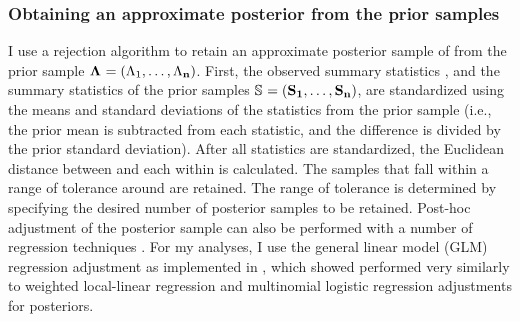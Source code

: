 \subsubsection{Obtaining an approximate posterior from the prior samples}
I use a rejection algorithm to retain an approximate posterior sample of
\paramSampleVector{} from the prior sample
$\boldsymbol{\Lambda_{}} = (\Lambda_{1}, \ldots, \Lambda_{\mathbf{n}})$.
First, the observed summary statistics \ssVectorObs, and the summary statistics
of the prior samples 
$\ssMatrix = (\ssVector{1}, \ldots, \ssVector{\numPriorSamples})$,
are standardized using the means and standard deviations of the statistics from
the prior sample (i.e., the prior mean is subtracted from each statistic, and the
difference is divided by the prior standard deviation).
After all statistics are standardized, the Euclidean distance between
\ssVectorObs and each \ssVector{} within \ssMatrix is calculated.
The samples that fall within a range of tolerance \tol around \ssVectorObs
are retained.
The range of tolerance is determined by specifying the desired number of
posterior samples to be retained.
Post-hoc adjustment of the posterior sample can also be performed with a number
of regression techniques \citep{Beaumont2002,Blum2009,Leuenberger2010}.
For my analyses, I use the general linear model (GLM) regression adjustment
\citep{Leuenberger2010} as implemented in \abctoolbox
\citep[v1.1;][]{ABCtoolbox}, which \citet{Oaks2012} showed performed very
similarly to weighted local-linear regression and multinomial logistic
regression adjustments \citep{Beaumont2002} for \msb posteriors.


